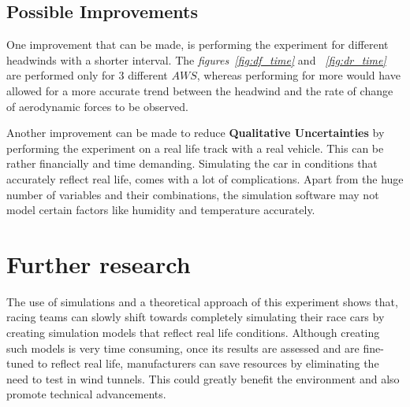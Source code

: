 \documentclass[11pt, a4paper]{article}
\begin{document}
\subsection{Possible Improvements}

One improvement that can be made, is performing the experiment for different headwinds with a shorter interval. The \textit{figures~\ref{fig:df_time}} and \textit{~\ref{fig:dr_time}}
are performed only for 3 different $AWS$, whereas performing for more would have allowed for a more accurate trend between the headwind and the rate of change of aerodynamic forces to be observed.

Another improvement can be made to reduce \textbf{Qualitative Uncertainties} by performing the experiment on a real life track with a real vehicle. This can be rather financially and time demanding. Simulating the car in conditions that accurately
reflect real life, comes with a lot of complications. Apart from the huge number of variables and their combinations, the simulation software may not model certain factors like humidity and temperature accurately.

\section{Further research}
The use of simulations and a theoretical approach of this experiment shows that, racing teams can slowly shift towards completely simulating their race cars by creating simulation models that reflect real life conditions.
Although creating such models is very time consuming, once its results are assessed and are fine-tuned to reflect real life, manufacturers can save resources by eliminating the need
to test in wind tunnels. This could greatly benefit the environment and also promote technical advancements.


\clearpage
\printbibliography{}
\end{document}
